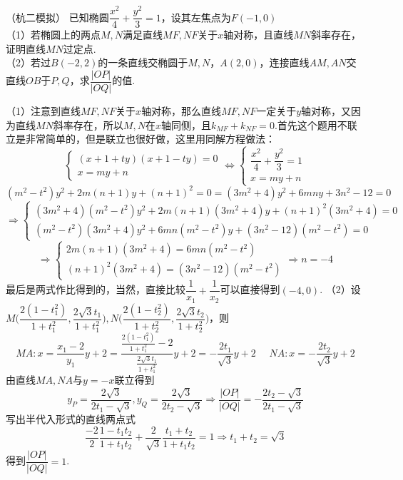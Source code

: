 \begin{example}{（杭二模拟）}{}
    \noindent 已知椭圆$\dfrac{x^2}{4}+\dfrac{y^2}{3}=1$，设其左焦点为$F(-1,0)$\vspace{10pt}\\
    （1）若椭圆上的两点$M,N$满足直线$MF,NF$关于$x$轴对称，且直线$MN$斜率存在，证明直线$MN$过定点.\\
    （2）若过$B(-2,2)$的一条直线交椭圆于$M,N$，$A(2,0)$，连接直线$AM,AN$交直线$OB$于$P,Q$，求$\dfrac{|OP|}{|OQ|}$的值.
\end{example}
\begin{solution}
    （1）注意到直线$MF,NF$关于$x$轴对称，那么直线$MF,NF$一定关于$y$轴对称，又因为直线$MN$斜率存在，所以$M,N$在$x$轴同侧，且$k_{MF}+k_{NF}=0$.首先这个题用不联立是非常简单的，但是联立也很好做，这里用同解方程做法：
    \[\begin{cases}(x+1+ty)(x+1-ty)=0\\x=my+n\end{cases}\Leftrightarrow \begin{cases}\dfrac{x^2}{4}+\dfrac{y^2}{3}=1\\x=my+n\end{cases}\]
    \[(m^2-t^2)y^2+2m(n+1)y+(n+1)^2=0=(3m^2+4)y^2+6mny+3n^2-12=0\]
\[\Rightarrow \begin{cases}(3m^2 + 4)(m^2 - t^2) y^2 + 2m(n+1)(3m^2 + 4) y + (n+1)^2 (3m^2 + 4) = 0\\(m^2 - t^2)(3m^2 + 4) y^2 + 6mn(m^2 - t^2) y + (3n^2 - 12)(m^2 - t^2) = 0\end{cases}\]\[\Rightarrow \begin{cases} 2m(n+1)(3m^2 + 4) = 6mn(m^2 - t^2)\\(n+1)^2(3m^2 + 4) = (3n^2-12)(m^2 - t^2)\end{cases}\Rightarrow n=-4\]
最后是两式作比得到的，当然，直接比较$\dfrac{1}{x_1}+\dfrac{1}{x_2}$可以直接得到$(-4,0)$.\vspace{10pt}\newline
    （2）设$M\bigg(\dfrac{2(1-t_1^2)}{1+t_1^2},\dfrac{2\sqrt{3}t_1}{1+t_1^2}\bigg),N\bigg(\dfrac{2(1-t_2^2)}{1+t_2^2},\dfrac{2\sqrt{3}t_2}{1+t_2^2}\bigg)$，则\[MA:x=\dfrac{x_1-2}{y_1}y+2=\dfrac{\frac{2(1-t_1^2)}{1+t_1^2}-2}{\frac{2\sqrt{3}t_1}{1+t_1^2}}y+2=-\dfrac{2t_1}{\sqrt3}y+2~~~~~~NA:x=-\dfrac{2t_2}{\sqrt3}y+2\]由直线$MA,NA$与$y=-x$联立得到
    \[y_P=\dfrac{2\sqrt3}{2t_1-\sqrt3},y_Q=\dfrac{2\sqrt3}{2t_2-\sqrt3}\Rightarrow \dfrac{|OP|}{|OQ|}=-\dfrac{2t_2-\sqrt3}{2t_1-\sqrt3}\]
    写出半代入形式的直线两点式\[\dfrac{-2}{2}\dfrac{1-t_1t_2}{1+t_1t_2}+\dfrac{2}{\sqrt3}\dfrac{t_1+t_2}{1+t_1t_2}=1\Rightarrow t_1+t_2=\sqrt3\]
    得到$\dfrac{|OP|}{|OQ|}=1$.
\end{solution}
